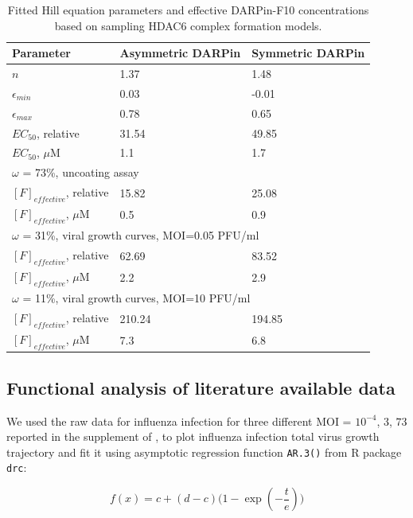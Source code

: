 \begin{table}[h!]
\centering
\caption[Fitted Hill equation parameters and effective DARPin-F10 concentrations]{Fitted Hill equation parameters and effective DARPin-F10 concentrations based on sampling HDAC6 complex formation models.}
\label{table:DARPinFittingCoefficients}

\begin{tabular}{p{5cm} p{3cm} p{3cm}}
\hline 
\textbf{Parameter} & \textbf{Asymmetric DARPin} & \textbf{Symmetric DARPin}\\
\hline
$n$ &                 1.37&    1.48\\
$\epsilon_{min}$ &    0.03&    -0.01\\
$\epsilon_{max}$ &    0.78&    0.65\\
$EC_{50}$, relative &          31.54&    49.85\\
$EC_{50}$, $\mu$M &          1.1&    1.7\\
\hline
\multicolumn{3}{l}{$\omega$ = 73\%, uncoating assay}\\
$[F]_{effective}$, relative & 15.82 & 25.08\\
$[F]_{effective}$, $\mu$M & 0.5 & 0.9\\
\hline
\multicolumn{3}{l}{$\omega$ = 31\%, viral growth curves, MOI=0.05 PFU/ml}\\
$[F]_{effective}$, relative & 62.69 & 83.52\\
$[F]_{effective}$, $\mu$M & 2.2 & 2.9\\
\hline
\multicolumn{3}{l}{$\omega$ = 11\%, viral growth curves, MOI=10 PFU/ml}\\
$[F]_{effective}$, relative & 210.24 & 194.85\\
$[F]_{effective}$, $\mu$M & 7.3 & 6.8\\
\hline
\end{tabular}
\end{table}

\subsection{Functional analysis of literature available data}

We used the raw data for influenza infection for three different MOI = $10^{-4}$, $3$, $73$ reported in the supplement of \cite{rudiger2019multiscale}, to plot influenza infection total virus growth trajectory and fit it using asymptotic regression function \texttt{AR.3()} from R package \texttt{drc}:

\begin{equation}
f(x) = c + (d-c)\big(1-\exp(-\frac{t}{e})\big)
\label{eq:ar3function}
\end{equation}

